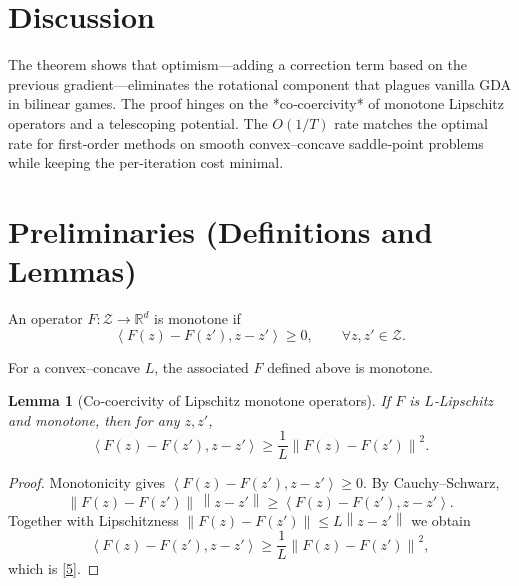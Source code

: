 \documentclass{article}
\newtheorem{lemma}{Lemma}
\newcommand{\R}{\mathbb{R}}
\newcommand{\norm}[1]{\left\lVert#1\right\rVert}
\newcommand{\inner}[2]{\left\langle #1,#2\right\rangle}
\begin{document}
\section*{Discussion}
The theorem shows that optimism—adding a correction term based on the previous gradient—eliminates the rotational component that plagues vanilla GDA in bilinear games. The proof hinges on the *co‑coercivity* of monotone Lipschitz operators and a telescoping potential. The $O(1/T)$ rate matches the optimal rate for first‑order methods on smooth convex–concave saddle‑point problems while keeping the per‑iteration cost minimal.

\newpage
\section*{Preliminaries (Definitions and Lemmas)}
\begin{definition}
An operator $F:\mathcal Z\to\R^{d}$ is monotone if 
\[
\inner{F(z)-F(z')}{z-z'}\ge0,\qquad\forall z,z'\in\mathcal Z .
\]
\end{definition}
For a convex–concave $L$, the associated $F$ defined above is monotone.

\begin{lemma}[Co‑coercivity of Lipschitz monotone operators]\label{lem:coerc}
If $F$ is $L$‑Lipschitz and monotone, then for any $z,z'$,
\[
\inner{F(z)-F(z')}{z-z'}\ge\frac{1}{L}\norm{F(z)-F(z')}^{2}.
\tag{5}
\]
\end{lemma}
\begin{proof}
Monotonicity gives $\inner{F(z)-F(z')}{z-z'}\ge0$. By Cauchy–Schwarz,
\[
\norm{F(z)-F(z')}\,\norm{z-z'}\ge\inner{F(z)-F(z')}{z-z'} .
\]
Together with Lipschitzness $\norm{F(z)-F(z')}\le L\norm{z-z'}$ we obtain
\[
\inner{F(z)-F(z')}{z-z'}\ge\frac{1}{L}\norm{F(z)-F(z')}^{2},
\]
which is \eqref{5}. \qedhere
\end{proof}
\end{document}
